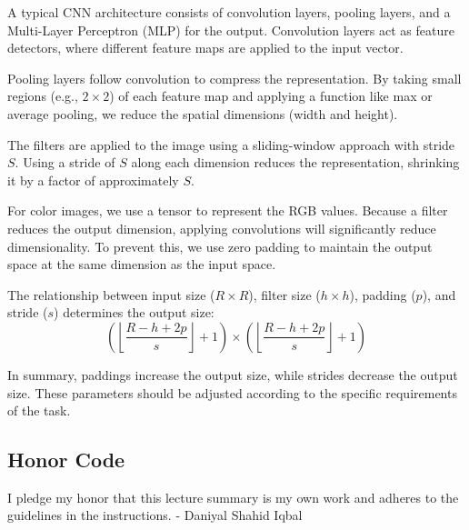 \documentclass{article}
\begin{document}
A typical CNN architecture consists of convolution layers, pooling layers, and a Multi-Layer Perceptron (MLP) for the output. Convolution layers act as feature detectors, where different feature maps are applied to the input vector.

Pooling layers follow convolution to compress the representation. By taking small regions (e.g., $2 \times 2$) of each feature map and applying a function like max or average pooling, we reduce the spatial dimensions (width and height). 

The filters are applied to the image using a sliding-window approach with stride $S$. Using a stride of $S$ along each dimension reduces the representation, shrinking it by a factor of approximately $S$.


For color images, we use a tensor to represent the RGB values. Because a filter reduces the output dimension, applying convolutions will significantly reduce dimensionality. To prevent this, we use zero padding to maintain the output space at the same dimension as the input space.

The relationship between input size ($R \times R$), filter size ($h \times h$), padding ($p$), and stride ($s$) determines the output size:
\[
\left(\left\lfloor \frac{R - h + 2p}{s} \right\rfloor + 1\right) \times \left(\left\lfloor \frac{R - h + 2p}{s} \right\rfloor + 1\right)
\]

In summary, paddings increase the output size, while strides decrease the output size. These parameters should be adjusted according to the specific requirements of the task.


\subsection*{Honor Code}
I pledge my honor that this lecture summary is my own work and adheres to the guidelines in the instructions.
- Daniyal Shahid Iqbal
\end{document}
